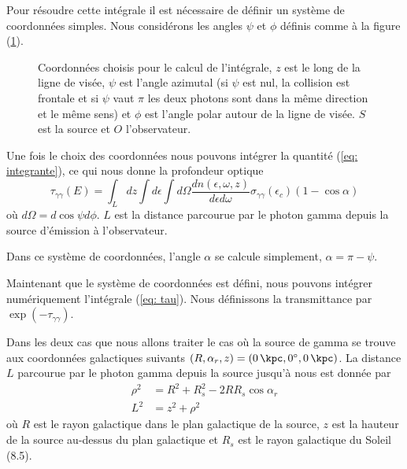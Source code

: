 \documentclass[a4paper,12pt,twoside]{article}
\begin{document}
Pour résoudre cette intégrale il est nécessaire de définir un système de coordonnées simples. Nous considérons les angles $\psi$ et $\phi$ définis comme à la figure (\ref{fig: coordonnee psi et phi}).


\begin{figure}[H]
	\centering
    \caption{Coordonnées choisis pour le calcul de l'intégrale, $z$ est le long de la ligne de visée, $\psi$ est l'angle azimutal (si $\psi$ est nul, la collision est frontale et si $\psi$ vaut $\pi$ les deux photons sont dans la même direction et le même sens) et $\phi$ est l'angle polar autour de la ligne de visée. $S$ est la source et $O$ l'observateur.}
    \label{fig: coordonnee psi et phi}
\end{figure}

Une fois le choix des coordonnées nous pouvons intégrer la quantité (\ref{eq: integrante}), ce qui nous donne la profondeur optique
\begin{equation}
	\tau_{\gamma \gamma}(E) = \int_{L} d z \int d \epsilon \int d \Omega \frac{d n(\epsilon, \omega, z)}{d \epsilon d \omega} \sigma_{\gamma \gamma}(\epsilon_c) (1 - \cos \alpha)
\end{equation}
\label{eq: tau}
où $d \Omega = d \cos\psi d \phi$. $L$ est la distance parcourue par le photon gamma depuis la source d'émission à l'observateur.

Dans ce système de coordonnées, l'angle $\alpha$ se calcule simplement, $\alpha = \pi - \psi$.

Maintenant que le système de coordonnées est défini, nous pouvons intégrer numériquement l'intégrale (\ref{eq: tau}). Nous définissons la transmittance par $\exp(-\tau_{\gamma \gamma})$.

Dans les deux cas que nous allons traiter le cas où la source de gamma se trouve aux coordonnées galactiques suivants $(R, \alpha_r, z) = (\SI{0}{\kpc}, \SI{0}{\degree}, \SI{0}{\kpc})$. La distance $L$ parcourue par le photon gamma depuis la source jusqu'à nous est donnée par
\begin{align*}
	\rho^2 &= R^2 + R^2_s - 2 R R_s \cos\alpha_r \\
    L^2 &= z^2 + \rho^2
\end{align*}
où $R$ est le rayon galactique dans le plan galactique de la source, $z$ est la hauteur de la source au-dessus du plan galactique et $R_s$ est le rayon galactique du Soleil (\SI{8.5}{\kpc}).
\end{document}
